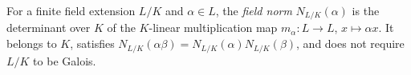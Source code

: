 
For a finite field extension $L/K$ and $\alpha\in L$, the \emph{field norm} $N_{L/K}(\alpha)$ is the determinant over $K$ of the $K$-linear multiplication map $m_\alpha:L\to L$, $x\mapsto\alpha x$. It belongs to $K$, satisfies $N_{L/K}(\alpha\beta)=N_{L/K}(\alpha)N_{L/K}(\beta)$, and does not require $L/K$ to be Galois.
